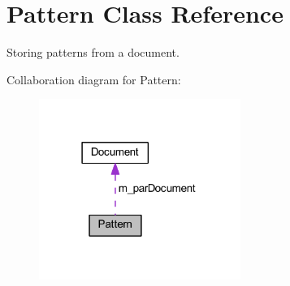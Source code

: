\hypertarget{class_pattern}{}\section{Pattern Class Reference}
\label{class_pattern}


Storing patterns from a document.  




Collaboration diagram for Pattern\+:
\nopagebreak
\begin{figure}[H]
\begin{center}
\leavevmode
\includegraphics[width=186pt]{class_pattern__coll__graph}
\end{center}
\end{figure}
